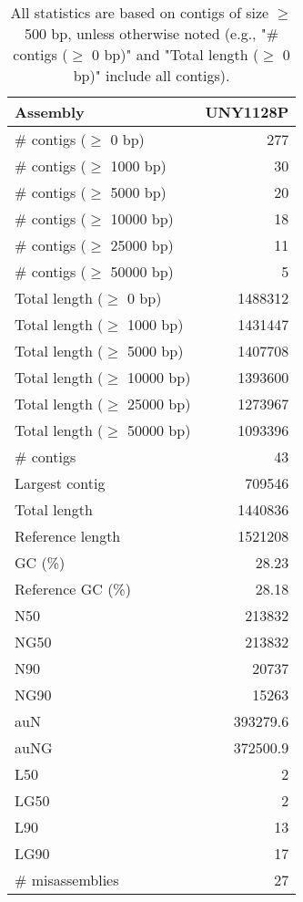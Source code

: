 \documentclass[12pt,a4paper]{article}
\begin{document}
\begin{table}[ht]
\begin{center}
\caption{All statistics are based on contigs of size $\geq$ 500 bp, unless otherwise noted (e.g., "\# contigs ($\geq$ 0 bp)" and "Total length ($\geq$ 0 bp)" include all contigs).}
\begin{tabular}{|l*{1}{|r}|}
\hline
Assembly & UNY1128P \\ \hline
\# contigs ($\geq$ 0 bp) & 277 \\ \hline
\# contigs ($\geq$ 1000 bp) & 30 \\ \hline
\# contigs ($\geq$ 5000 bp) & 20 \\ \hline
\# contigs ($\geq$ 10000 bp) & 18 \\ \hline
\# contigs ($\geq$ 25000 bp) & 11 \\ \hline
\# contigs ($\geq$ 50000 bp) & 5 \\ \hline
Total length ($\geq$ 0 bp) & 1488312 \\ \hline
Total length ($\geq$ 1000 bp) & 1431447 \\ \hline
Total length ($\geq$ 5000 bp) & 1407708 \\ \hline
Total length ($\geq$ 10000 bp) & 1393600 \\ \hline
Total length ($\geq$ 25000 bp) & 1273967 \\ \hline
Total length ($\geq$ 50000 bp) & 1093396 \\ \hline
\# contigs & 43 \\ \hline
Largest contig & 709546 \\ \hline
Total length & 1440836 \\ \hline
Reference length & 1521208 \\ \hline
GC (\%) & 28.23 \\ \hline
Reference GC (\%) & 28.18 \\ \hline
N50 & 213832 \\ \hline
NG50 & 213832 \\ \hline
N90 & 20737 \\ \hline
NG90 & 15263 \\ \hline
auN & 393279.6 \\ \hline
auNG & 372500.9 \\ \hline
L50 & 2 \\ \hline
LG50 & 2 \\ \hline
L90 & 13 \\ \hline
LG90 & 17 \\ \hline
\# misassemblies & 27 \\ \hline

\end{tabular}
\end{center}
\end{table}
\end{document}

